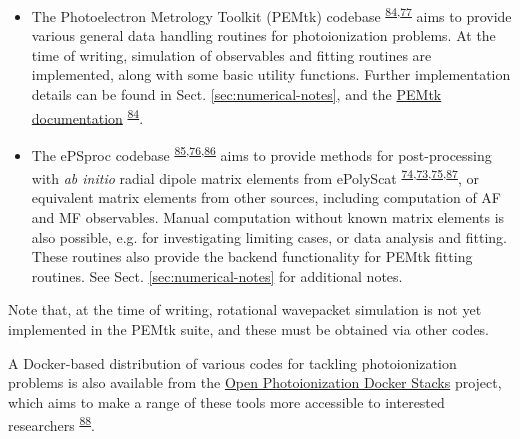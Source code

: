 \documentclass[10pt]{article}
\begin{document}
\begin{itemize}
\item The Photoelectron Metrology Toolkit (PEMtk) codebase \textsuperscript{\hyperref[csl:84]{84},\hyperref[csl:77]{77}} aims to provide various general data handling routines for photoionization problems. At the time of writing, simulation of observables and fitting routines are implemented, along with some basic utility functions. Further implementation details can be found in Sect. \ref{sec:numerical-notes}, and the \href{https://pemtk.readthedocs.io/en/latest/about.html}{PEMtk documentation} \textsuperscript{\hyperref[csl:84]{84}}.
\item The ePSproc codebase \textsuperscript{\hyperref[csl:85]{85},\hyperref[csl:76]{76},\hyperref[csl:86]{86}} aims to provide methods for post-processing with \textit{ab initio} radial dipole matrix elements from ePolyScat \textsuperscript{\hyperref[csl:74]{74},\hyperref[csl:73]{73},\hyperref[csl:75]{75},\hyperref[csl:87]{87}}, or equivalent matrix elements from other sources, including computation of AF and MF observables. Manual computation without known matrix elements is also possible, e.g. for investigating limiting cases, or data analysis and fitting. These routines also provide the backend functionality for PEMtk fitting routines. See Sect. \ref{sec:numerical-notes} for additional notes.
\end{itemize}

Note that, at the time of writing, rotational wavepacket simulation is not yet implemented in the PEMtk suite, and these must be obtained via other codes. %

A Docker-based distribution of various codes for tackling photoionization problems is also available from the \href{https://github.com/phockett/open-photoionization-docker-stacks}{Open Photoionization Docker Stacks} project, which aims to make a range of these tools more accessible to interested researchers \textsuperscript{\hyperref[csl:88]{88}}.







\end{document}
